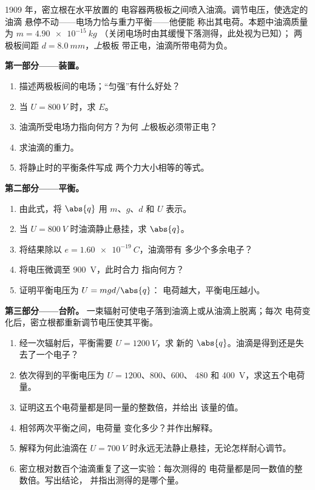 \begin{problem}
\label{pb:g11:electric-gravitational-fields:1}
1909 年，密立根在水平放置的
电容器两极板之间喷入油滴。调节电压，使选定的油滴
悬停不动——电场力恰与重力平衡——他便能
称出其电荷。本题中油滴质量为 $m = \qty{4.90e-15}{kg}$
（关闭电场时由其缓慢下落测得，此处视为已知）；
两极板间距 $d = \qty{8.0}{mm}$，\emph{上}极板
带正电，油滴所带电荷为负。

\medskip
\noindent\textbf{第一部分——装置。}
\begin{enumerate}
  \item 描述两极板间的电场；“匀强”有什么好处？
  \item 当 $U = \qty{800}{V}$ 时，求 $E$。
  \item 油滴所受电场力指向何方？为何
        \emph{上}极板必须带正电？
  \item 求油滴的重力。
  \item 将静止时的平衡条件写成
        两个力大小相等的等式。
\end{enumerate}

\medskip
\noindent\textbf{第二部分——平衡。}
\begin{enumerate}[resume]
  \item 由此式，将 $\abs{q}$ 用 $m$、$g$、$d$ 和 $U$ 表示。
  \item 当 $U = \qty{800}{V}$ 时油滴静止悬挂，求
        $\abs{q}$。
  \item 将结果除以 $e = \qty{1.60e-19}{C}$，油滴带有
        多少个多余电子？
  \item 将电压微调至 \qty{900}{V}，此时合力
        指向何方？
  \item 证明平衡电压为 $U = mgd/\abs{q}$：
        电荷越大，平衡电压越小。
\end{enumerate}

\medskip
\noindent\textbf{第三部分——台阶。}
一束辐射可使电子落到油滴上或从油滴上脱离；每次
电荷变化后，密立根都重新调节电压使其平衡。
\begin{enumerate}[resume]
  \item 经一次辐射后，平衡需要 $U = \qty{1200}{V}$，求
        新的 $\abs{q}$。油滴是得到还是失去了一个电子？
  \item 依次得到的平衡电压为 $U = 1200$、$800$、$600$、
        $480$ 和 \qty{400}{V}，求这五个电荷量。
  \item 证明这五个电荷量都是同一量的整数倍，并给出
        该量的值。
  \item 相邻两次平衡之间，电荷量
        变化多少？并作出解释。
  \item 解释为何此油滴在
        $U = \qty{700}{V}$ 时永远无法静止悬挂，无论怎样耐心调节。
  \item 密立根对数百个油滴重复了这一实验：每次测得的
        电荷量都是同一数值的整数倍。写出结论，
        并指出测得的是哪个量。
\end{enumerate}


\end{problem}
